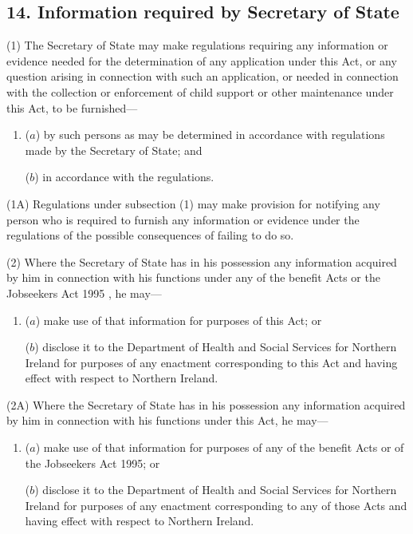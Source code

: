 \documentclass[12pt,a4paper]{article}
\begin{document}
\subsection{14. Information required by Secretary of State}

(1) The Secretary of State may make regulations requiring any information or evidence needed for the determination of any application under this Act, or any question arising in connection with such an application, or needed in connection with the collection or enforcement of child support or other maintenance under this Act, to be furnished—
\begin{enumerate}\item[]
($a$) by such persons as may be determined in accordance with regulations made by the Secretary of State; and

($b$) in accordance with the regulations.
\end{enumerate}

(1A) Regulations under subsection (1) may make provision for notifying any person who is required to furnish any information or evidence under the regulations of the possible consequences of failing to do so.

(2) Where the Secretary of State has in his possession any information acquired by him in connection with his functions under any of the benefit Acts
or the Jobseekers Act 1995%
, he may—
\begin{enumerate}\item[]
($a$) make use of that information for purposes of this Act; or

($b$) disclose it to the Department of Health and Social Services for Northern Ireland for purposes of any enactment corresponding to this Act and having effect with respect to Northern Ireland.
\end{enumerate}

(2A) Where the Secretary of State has in his possession any information acquired by him in connection with his functions under this Act, he may—
\begin{enumerate}\item[]
($a$) make use of that information for purposes of any of the benefit Acts or of the Jobseekers Act 1995; or

($b$) disclose it to the Department of Health and Social Services for Northern Ireland for purposes of any enactment corresponding to any of those Acts and having effect with respect to Northern Ireland.
\end{enumerate}
\end{document}
